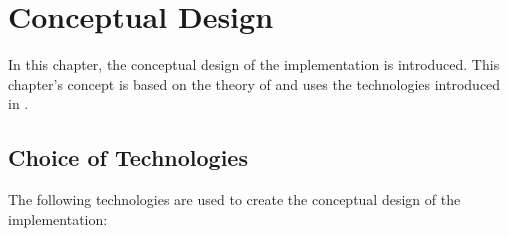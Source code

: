 \chapter{Conceptual Design}
\label{chap:05_design}

In this chapter, the conceptual design of the implementation is introduced. This chapter's concept is based on the theory of  and uses the technologies introduced in .


\section{Choice of Technologies}
\label{sec:05_restrictions}
The following technologies are used to create the conceptual design of the implementation:

